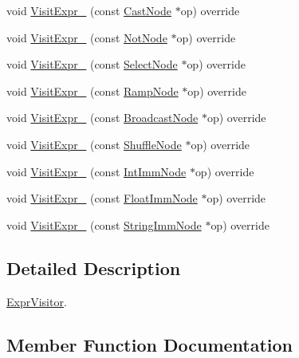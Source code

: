 \begin{DoxyCompactItemize}
\item 
void \hyperlink{classtvm_1_1tir_1_1ExprVisitor_a2bde617452ce9c160cf8bf6f6db89601}{Visit\+Expr\+\_\+} (const \hyperlink{classtvm_1_1tir_1_1CastNode}{Cast\+Node} $\ast$op) override
\item 
void \hyperlink{classtvm_1_1tir_1_1ExprVisitor_a893148a9d3d5fa9b76ce653f04d19140}{Visit\+Expr\+\_\+} (const \hyperlink{classtvm_1_1tir_1_1NotNode}{Not\+Node} $\ast$op) override
\item 
void \hyperlink{classtvm_1_1tir_1_1ExprVisitor_a4490d95fc014da418769ac27589ea51b}{Visit\+Expr\+\_\+} (const \hyperlink{classtvm_1_1tir_1_1SelectNode}{Select\+Node} $\ast$op) override
\item 
void \hyperlink{classtvm_1_1tir_1_1ExprVisitor_a36a25512b8729660c5f3bd7a94085880}{Visit\+Expr\+\_\+} (const \hyperlink{classtvm_1_1tir_1_1RampNode}{Ramp\+Node} $\ast$op) override
\item 
void \hyperlink{classtvm_1_1tir_1_1ExprVisitor_a8d6d70c40f607e9e438d7f40d4cb2d68}{Visit\+Expr\+\_\+} (const \hyperlink{classtvm_1_1tir_1_1BroadcastNode}{Broadcast\+Node} $\ast$op) override
\item 
void \hyperlink{classtvm_1_1tir_1_1ExprVisitor_ad83b97a96f2efb935182fd0a5e0b6db0}{Visit\+Expr\+\_\+} (const \hyperlink{classtvm_1_1tir_1_1ShuffleNode}{Shuffle\+Node} $\ast$op) override
\item 
void \hyperlink{classtvm_1_1tir_1_1ExprVisitor_a375334641aa93fdc9354a0e0dc636284}{Visit\+Expr\+\_\+} (const \hyperlink{namespacetvm_1_1tir_ae8c7db788e840dc1c2ed1f365d5ea829}{Int\+Imm\+Node} $\ast$op) override
\item 
void \hyperlink{classtvm_1_1tir_1_1ExprVisitor_a8f990531a61731bc5465577f5c6571d5}{Visit\+Expr\+\_\+} (const \hyperlink{namespacetvm_1_1tir_adb123be81447d2871f4c716ce2d1dc00}{Float\+Imm\+Node} $\ast$op) override
\item 
void \hyperlink{classtvm_1_1tir_1_1ExprVisitor_a5ea877b24afb7654fe457c13bcee9620}{Visit\+Expr\+\_\+} (const \hyperlink{classtvm_1_1tir_1_1StringImmNode}{String\+Imm\+Node} $\ast$op) override
\end{DoxyCompactItemize}


\subsection{Detailed Description}
\hyperlink{classtvm_1_1tir_1_1ExprVisitor}{Expr\+Visitor}. 

\subsection{Member Function Documentation}
